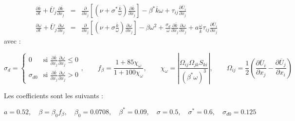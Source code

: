 \begin{eqnarray*}
\frac{\partial\overline{k}}{\partial t}+\overline{U}_{j}\frac{\partial\overline{k}}{\partial x_{j}} & = & \frac{\partial}{\partial x_{j}}\left[\left(\nu+\sigma^{*}\frac{\overline{k}}{\omega}\right)\frac{\partial\overline{k}}{\partial x_{j}}\right]-\beta^{*}\overline{k}\omega+\tau_{ij}\frac{\partial\overline{U}_{i}}{\partial x_{j}}\\
\frac{\partial\omega}{\partial t}+\overline{U}_{j}\frac{\partial\omega}{\partial x_{j}} & = & \frac{\partial}{\partial x_{j}}\left[\left(\nu+\sigma\frac{\overline{k}}{\omega}\right)\frac{\partial\omega}{\partial x_{j}}\right]-\beta\omega^{2}+\frac{\sigma_{d}}{\omega}\frac{\partial\overline{k}}{\partial x_{j}}\frac{\partial\omega}{\partial x_{j}}+a\frac{\omega}{\overline{k}}\tau_{ij}\frac{\partial\overline{U}_{i}}{\partial x_{j}}
\end{eqnarray*}
avec :

\[
\sigma_{d}=\begin{cases}
0 & \mbox{si }\frac{\partial\overline{k}}{\partial x_{j}}\frac{\partial\omega}{\partial x_{j}}\leq0\\
\sigma_{d0} & \mbox{si }\frac{\partial\overline{k}}{\partial x_{j}}\frac{\partial\omega}{\partial x_{j}}>0
\end{cases},\qquad f_{\beta}=\frac{1+85\chi_{\omega}}{1+100\chi_{\omega}},\qquad\chi_{\omega}=\left|\frac{\Omega_{ij}\Omega_{jk}S_{ki}}{(\beta^{*}\omega)^{3}}\right|,\qquad\Omega_{ij}=\frac{1}{2}\left(\frac{\partial\overline{U}_{i}}{\partial x_{j}}-\frac{\partial\overline{U}_{j}}{\partial x_{i}}\right)
\]


Les coefficients sont les suivants :

\[
a=0.52,\quad\beta=\beta_{0}f_{\beta},\quad\beta_{0}=0.0708,\quad\beta^{*}=0.09,\quad\sigma=0.5,\quad\sigma^{*}=0.6,\quad\sigma_{d0}=0.125
\]
